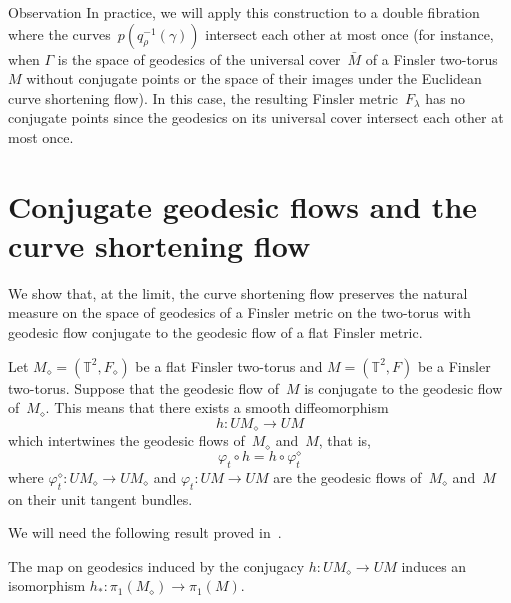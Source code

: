 \documentclass[AHL,Unicode,longabstracts,published]{cedram}
\newcommand{\T}{\mathbb{T}}
\begin{document}
\begin{enonce}{Observation} \label{obs:ncp}
In practice, we will apply this construction to a double fibration where the curves~$p(q_{\rho}^{-1}(\gamma))$ intersect each other at most once (for instance, when $\Gamma$ is the space of geodesics of the universal cover~$\bar{M}$ of a Finsler two-torus~$M$ without conjugate points or the space of their images under the Euclidean curve shortening flow). In this case, the resulting Finsler metric~$F_\lambda$ has no conjugate points since the geodesics on its universal cover intersect each other at most once.
\end{enonce}



\section{Conjugate geodesic flows and the curve shortening flow} \label{sec:conjugate}


We show that, at the limit, the curve shortening flow preserves the natural measure on the space of geodesics of a Finsler metric on the two-torus with geodesic flow conjugate to the geodesic flow of a flat Finsler metric. 


Let $M_\diamond=(\T^2,F_\diamond)$ be a flat Finsler two-torus and $M=(\T^2,F)$ be a Finsler two-torus. Suppose that the geodesic flow of~$M$ is conjugate to the geodesic flow of~$M_\diamond$. This means that there exists a smooth diffeomorphism
\[
h:UM_\diamond \to UM
\]
which intertwines the geodesic flows of~$M_\diamond$ and~$M$, that is,
\[
\varphi_t \circ h = h \circ \varphi^\diamond_t
\]
where $\varphi^\diamond_t:UM_\diamond \to UM_\diamond$ and $\varphi_t:UM \to UM$ are the geodesic flows of~$M_\diamond$ and~$M$ on their unit tangent bundles.

We will need the following result proved in~\cite[\S~IV]{cro90}.

\begin{lemm}\label{lem:isom}
The map on geodesics induced by the conjugacy $h:UM_\diamond \to UM$ induces an isomorphism $h_*:\pi_1(M_\diamond) \to \pi_1(M)$.
\end{lemm}
\end{document}
